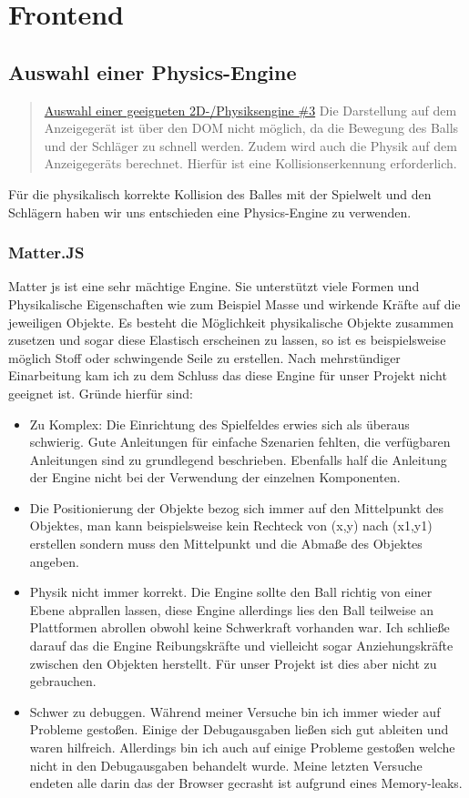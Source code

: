 \chapter{Frontend}
\section{Auswahl einer Physics-Engine}

\begin{quote}
	\href{https://github.com/Transport-Protocol/MBC-Ping-Pong/issues/3}{Auswahl einer geeigneten 2D-/Physiksengine \#3}
	\newline
	Die Darstellung auf dem Anzeigegerät ist über den DOM nicht möglich, da die Bewegung des Balls und der Schläger zu schnell werden. Zudem wird auch die Physik auf dem Anzeigegeräts berechnet. Hierfür ist eine Kollisionserkennung erforderlich.
\end{quote}
Für die physikalisch korrekte Kollision des Balles mit der Spielwelt und den Schlägern haben wir uns entschieden eine Physics-Engine zu verwenden.

\subsection{Matter.JS}
Matter js ist eine sehr mächtige Engine. Sie unterstützt viele Formen und Physikalische Eigenschaften wie zum Beispiel Masse und wirkende Kräfte auf die jeweiligen Objekte. 
Es besteht die Möglichkeit physikalische Objekte zusammen zusetzen und sogar diese Elastisch erscheinen zu lassen, so ist es beispielsweise möglich Stoff oder schwingende Seile zu erstellen.
Nach mehrstündiger Einarbeitung kam ich zu dem Schluss das diese Engine für unser Projekt nicht geeignet ist.
Gründe hierfür sind:
\begin{itemize}
	\item
	      Zu Komplex:
	      Die Einrichtung des Spielfeldes erwies sich als überaus schwierig. Gute Anleitungen für einfache Szenarien fehlten, die verfügbaren Anleitungen sind zu grundlegend beschrieben.
	      Ebenfalls half die Anleitung der Engine nicht bei der Verwendung der einzelnen Komponenten.
	\item
	      Die Positionierung der Objekte bezog sich immer auf den Mittelpunkt des Objektes, man kann beispielsweise kein Rechteck von (x,y) nach (x1,y1) erstellen sondern muss den Mittelpunkt und die Abmaße des Objektes angeben.
	\item
	      Physik nicht immer korrekt. Die Engine sollte den Ball richtig von einer Ebene abprallen lassen, diese Engine allerdings lies den Ball teilweise an Plattformen abrollen obwohl keine Schwerkraft vorhanden war. Ich schließe darauf das die Engine Reibungskräfte und vielleicht sogar Anziehungskräfte zwischen den Objekten herstellt. Für unser Projekt ist dies aber nicht zu gebrauchen.
	\item
	      Schwer zu debuggen. Während meiner Versuche bin ich immer wieder auf Probleme gestoßen. Einige der Debugausgaben ließen sich gut ableiten und waren hilfreich. 
	      Allerdings bin ich auch auf einige Probleme gestoßen welche nicht in den Debugausgaben behandelt wurde. Meine letzten Versuche endeten alle darin das der Browser gecrasht ist aufgrund eines Memory-leaks.
\end{itemize}
